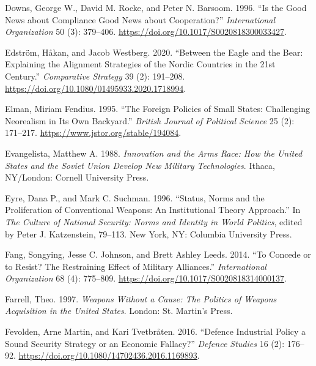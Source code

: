 \documentclass[
  12,
  letterpaper,
  DIV=11,
  numbers=noendperiod]{scrartcl}
\newlength{\cslhangindent}
\newlength{\cslentryspacingunit} %
\newenvironment{CSLReferences}[2] %
 {%
  \setlength{\parindent}{0pt}
  \ifodd #1
  \let\oldpar\par
  \def\par{\hangindent=\cslhangindent\oldpar}
  \fi
  \setlength{\parskip}{#2\cslentryspacingunit}
 }%
 {}
\begin{document}
\begin{CSLReferences}{1}{0}
\leavevmode{}%
Downs, George W., David M. Rocke, and Peter N. Barsoom. 1996. {``Is the
Good News about Compliance Good News about Cooperation?''}
\emph{International Organization} 50 (3): 379--406.
\url{https://doi.org/10.1017/S0020818300033427}.

\leavevmode{}%
Edström, Håkan, and Jacob Westberg. 2020. {``Between the Eagle and the
Bear: {Explaining} the Alignment Strategies of the {Nordic} Countries in
the 21st Century.''} \emph{Comparative Strategy} 39 (2): 191--208.
\url{https://doi.org/10.1080/01495933.2020.1718994}.

\leavevmode{}%
Elman, Miriam Fendius. 1995. {``The {Foreign Policies} of {Small
States}: {Challenging Neorealism} in {Its Own Backyard}.''}
\emph{British Journal of Political Science} 25 (2): 171--217.
\url{https://www.jstor.org/stable/194084}.

\leavevmode{}%
Evangelista, Matthew A. 1988. \emph{Innovation and the {Arms Race}:
{How} the {United States} and the {Soviet Union Develop New Military
Technologies}}. {Ithaca, NY/London}: {Cornell University Press}.

\leavevmode{}%
Eyre, Dana P., and Mark C. Suchman. 1996. {``Status, {Norms} and the
{Proliferation} of {Conventional Weapons}: {An Institutional Theory
Approach}.''} In \emph{The {Culture} of {National Security}: {Norms} and
{Identity} in {World Politics}}, edited by Peter J. Katzenstein,
79--113. {New York, NY}: {Columbia University Press}.

\leavevmode{}%
Fang, Songying, Jesse C. Johnson, and Brett Ashley Leeds. 2014. {``To
{Concede} or to {Resist}? {The Restraining Effect} of {Military
Alliances}.''} \emph{International Organization} 68 (4): 775--809.
\url{https://doi.org/10.1017/S0020818314000137}.

\leavevmode{}%
Farrell, Theo. 1997. \emph{Weapons {Without} a {Cause}: {The Politics}
of {Weapons Acquisition} in the {United States}}. {London}: {St.
Martin's Press}.

\leavevmode{}%
Fevolden, Arne Martin, and Kari Tvetbråten. 2016. {``Defence Industrial
Policy \textendash{} a Sound Security Strategy or an Economic
Fallacy?''} \emph{Defence Studies} 16 (2): 176--92.
\url{https://doi.org/10.1080/14702436.2016.1169893}.


\end{CSLReferences}
\end{document}
